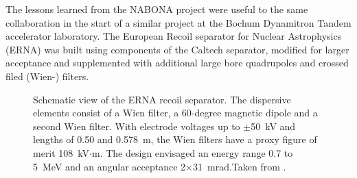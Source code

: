 The lessons learned from the NABONA project were useful to the same collaboration in the start of a similar project at the Bochum Dynamitron Tandem accelerator laboratory. The European Recoil separator for Nuclear Astrophysics (ERNA) was built using components of the Caltech separator, modified for larger acceptance and supplemented with additional large bore quadrupoles and crossed filed (Wien-) filters.
\begin{figure}
\begin{center}
\caption{Schematic view of the ERNA recoil separator. The dispersive elements consist of a Wien filter, a 60-degree magnetic dipole and a second Wien filter.    With electrode voltages up to $\pm$50~kV and lengths of 0.50 and 0.578~m, the Wien filters have a proxy figure of merit 108~kV$\cdot$m.   The design envisaged an energy range 0.7 to 5~MeV and an angular acceptance 2$\times$31~mrad.Taken from \cite{dile08}.}
\label{fig:erna}       %
\end{center}
\end{figure}
